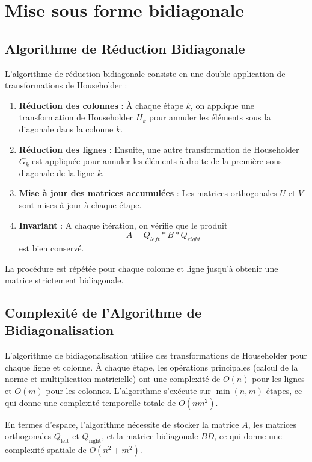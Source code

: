 \documentclass{article}
\begin{document}
\section{Mise sous forme bidiagonale}
\subsection{Algorithme de Réduction Bidiagonale}

L'algorithme de réduction bidiagonale consiste en une double application de transformations de Householder :

\begin{enumerate}
    \item \textbf{Réduction des colonnes} : À chaque étape \( k \), on applique une transformation de Householder \( H_k \) pour annuler les éléments sous la diagonale dans la colonne \( k \).
    \item \textbf{Réduction des lignes} : Ensuite, une autre transformation de Householder \( G_k \) est appliquée pour annuler les éléments à droite de la première sous-diagonale de la ligne \( k \).
    \item \textbf{Mise à jour des matrices accumulées} : Les matrices orthogonales \( U \) et \( V \) sont mises à jour à chaque étape.

    \item \textbf{Invariant} : A chaque itération, on vérifie que le produit \[ A = Q_{left} * B * Q_{right}  \] est bien conservé.
\end{enumerate}

La procédure est répétée pour chaque colonne et ligne jusqu'à obtenir une matrice strictement bidiagonale.

\subsection{Complexité de l'Algorithme de Bidiagonalisation}

L'algorithme de bidiagonalisation utilise des transformations de Householder pour chaque ligne et colonne. À chaque étape, les opérations principales (calcul de la norme et multiplication matricielle) ont une complexité de \( O(n) \) pour les lignes et \( O(m) \) pour les colonnes. L'algorithme s'exécute sur \( \min(n, m) \) étapes, ce qui donne une complexité temporelle totale de \( O(n m^2) \).

En termes d'espace, l'algorithme nécessite de stocker la matrice \( A \), les matrices orthogonales \( Q_{\text{left}} \) et \( Q_{\text{right}} \), et la matrice bidiagonale \( BD \), ce qui donne une complexité spatiale de \( O(n^2 + m^2) \).
\end{document}
